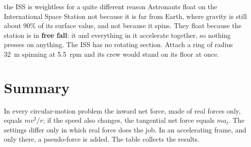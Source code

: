\begin{trapbox}{the ISS is weightless for a quite different reason}
Astronauts float on the International Space Station not because it is far from Earth, where gravity is
still about $90\%$ of its surface value, and not because it spins. They float because the station is in
\textbf{free fall}: it and everything in it accelerate together, so nothing presses on anything. The ISS
has no rotating section. Attach a ring of radius \SI{32}{m} spinning at \SI{5.5}{rpm} and its crew
would stand on its floor at once.
\end{trapbox}

\section{Summary}\label{sec:summary10}
In every circular-motion problem the inward net force, made of real forces only, equals $mv^2/r$; if the
speed also changes, the tangential net force equals $ma_t$. The settings differ only in which real force
does the job. In an accelerating frame, and only there, a pseudo-force is added. The table collects the
results.

